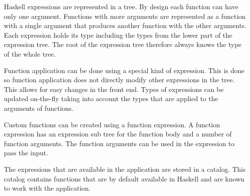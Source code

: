 Haskell expressions are represented in a tree.
By design each function can have only one argument.
Functions with more arguments are represented as a function with a single argument that produces another function with the other arguments.
Each expression holds its type including the types from the lower part of the expression tree. The root of the
expression tree therefore always knows the type of the whole tree.

Function application can be done using a special kind of expression.
This is done so function application does not directly modify other expressions in the tree.
This allows for easy changes in the front end.
Types of expressions can be updated on-the-fly taking into account the types that are applied to the arguments of functions.

Custom functions can be created using a function expression.
A function expression has an expression sub tree for the function body and a number of function arguments.
The function arguments can be used in the expression to pass the input.

The expressions that are available in the application are stored in a catalog. This catalog contains functions that are
by default available in Haskell and are known to work with the application.
